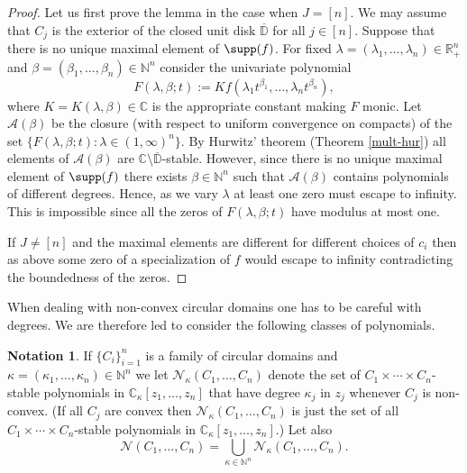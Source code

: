 \documentclass[10pt,reqno]{amsart}
\theoremstyle{plain}
\theoremstyle{definition}
\newtheorem{notation}{Notation}[section]
\theoremstyle{remark}
\numberwithin{equation}{section}
\newcommand{\NN}{\mathbb{N}}
\newcommand{\NV}{\mathcal{N}}
\newcommand{\RR}{\mathbb{R}}
\newcommand{\CC}{\mathbb{C}}
\newcommand{\DD}{\mathbb{D}}
\begin{document}
\begin{proof} 
Let us first prove the lemma in the case when $J=[n]$. 
We may assume that $C_j$ is the exterior of the 
 closed unit disk $\overline{\DD}$ for all $j \in [n]$. Suppose that there is 
no unique maximal element of $\supp(f)$. For fixed  
$\lambda=(\lambda_1,\ldots,\lambda_n) \in \RR_+^n$ and 
$\beta=(\beta_1,\ldots,\beta_n)\in\NN^n$  consider the univariate polynomial 
$$
F(\lambda,\beta ;t):= K f(\lambda_1t^{\beta_1}, \ldots, \lambda_nt^{\beta_n}),
$$
where $K=K(\lambda,\beta) \in \CC$ is the appropriate constant making $F$ 
monic.  
Let $\mathcal{A}(\beta)$ be the closure (with respect to uniform convergence 
on compacts) of the set 
$
\{ F(\lambda,\beta;t) : \lambda \in (1, \infty)^n \}. 
$
By Hurwitz' theorem (Theorem \ref{mult-hur}) 
all elements of $\mathcal{A}(\beta)$ are 
$\CC\setminus\overline{\DD}$-stable. However, since there is no unique 
maximal element of $\supp(f)$ there exists $\beta\in\NN^n$ such that 
$\mathcal{A}(\beta)$ contains polynomials of different degrees. 
Hence, as we vary $\lambda$ at least one zero must escape to infinity. 
This is impossible since all the zeros of $F(\lambda,\beta;t)$ have modulus 
at most one. 

If $J \neq [n]$ and the maximal elements are different for different choices 
of $c_i$ then as above some zero of a specialization of $f$ would escape to 
infinity contradicting the boundedness of the zeros.   
\end{proof}
When dealing with non-convex circular domains one has to be careful with 
degrees. We are therefore led to consider the following classes of 
polynomials. 

\begin{notation}\label{not-nv}
If $\{C_i\}_{i=1}^n$ is a family of circular domains and 
$\kappa=(\kappa_1,\ldots,\kappa_n) \in \NN^n$ we let 
$\NV_\kappa(C_1,\ldots,C_n)$ denote the set of 
$C_1 \times \cdots \times C_n$-stable polynomials in  
 $\CC_\kappa[z_1,\ldots,z_n]$ that have degree $\kappa_j$ in 
$z_j$ whenever $C_j$ is non-convex. (If all $C_j$ are convex then 
$\NV_\kappa(C_1,\ldots,C_n)$ is just the set of all 
$C_1 \times \cdots \times C_n$-stable polynomials in  
$\CC_\kappa[z_1,\ldots,z_n]$.) Let also
$$
\NV(C_1,\ldots,C_n)=\bigcup_{\kappa\in\NN^n}\NV_\kappa(C_1,\ldots,C_n). 
$$
\end{notation}
\end{document}
